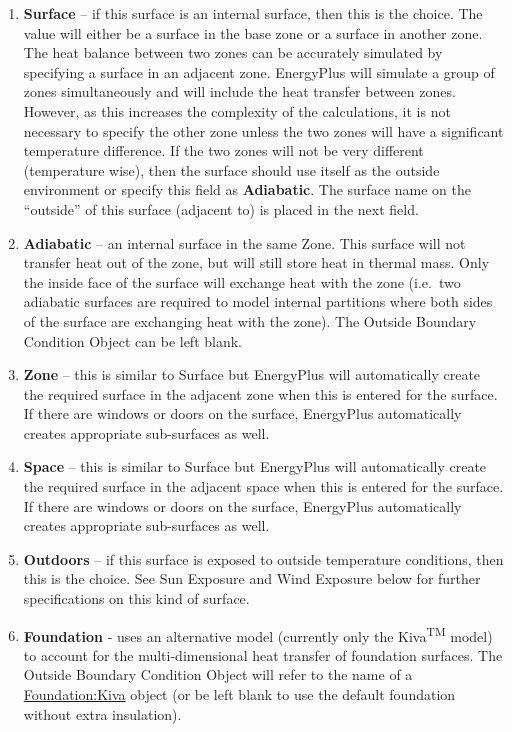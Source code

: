 \begin{enumerate}
  \item
    \textbf{Surface} -- if this surface is an internal surface, then this is the choice. The value will either be a surface in the base zone or a surface in another zone. The heat balance between two zones can be accurately simulated by specifying a surface in an adjacent zone. EnergyPlus will simulate a group of zones simultaneously and will include the heat transfer between zones. However, as this increases the complexity of the calculations, it is not necessary to specify the other zone unless the two zones will have a significant temperature difference. If the two zones will not be very different (temperature wise), then the surface should use itself as the outside environment or specify this field as \textbf{Adiabatic}. The surface name on the ``outside'' of this surface (adjacent to) is placed in the next field.
  \item
    \textbf{Adiabatic} -- an internal surface in the same Zone. This surface will not transfer heat out of the zone, but will still store heat in thermal mass. Only the inside face of the surface will exchange heat with the zone (i.e.~two adiabatic surfaces are required to model internal partitions where both sides of the surface are exchanging heat with the zone). The Outside Boundary Condition Object can be left blank.
  \item
    \textbf{Zone} -- this is similar to Surface but EnergyPlus will automatically create the required surface in the adjacent zone when this is entered for the surface. If there are windows or doors on the surface, EnergyPlus automatically creates appropriate sub-surfaces as well.
  \item
    \textbf{Space} -- this is similar to Surface but EnergyPlus will automatically create the required surface in the adjacent space when this is entered for the surface. If there are windows or doors on the surface, EnergyPlus automatically creates appropriate sub-surfaces as well.
  \item
    \textbf{Outdoors} -- if this surface is exposed to outside temperature conditions, then this is the choice. See Sun Exposure and Wind Exposure below for further specifications on this kind of surface.
  \item
    \textbf{Foundation} - uses an alternative model (currently only the Kiva\textsuperscript{TM} model) to account for the multi-dimensional heat transfer of foundation surfaces. The Outside Boundary Condition Object will refer to the name of a \hyperref[foundationkiva]{Foundation:Kiva} object (or be left blank to use the default foundation without extra insulation).

\end{enumerate}
